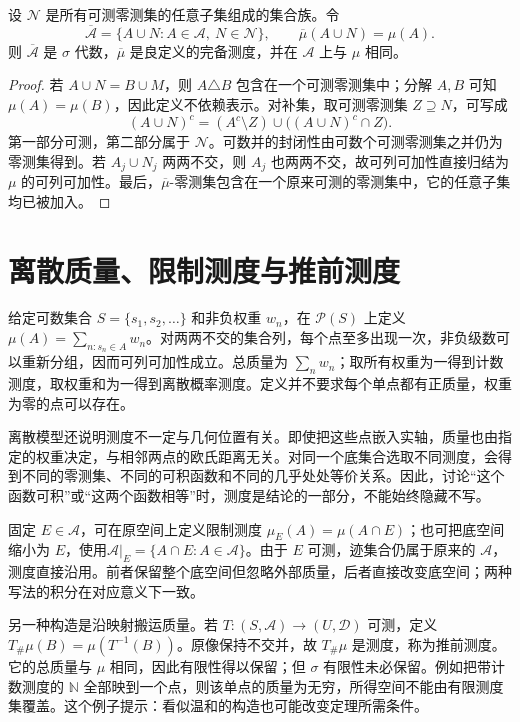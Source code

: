 \documentclass[UTF8,12pt,a4paper,fontset=fandol]{ctexbook}
\begin{document}
\begin{proposition}[完备化]
设 $\mathcal N$ 是所有可测零测集的任意子集组成的集合族。令
\[
 \overline{\mathcal A}=\{A\cup N:A\in\mathcal A,\ N\in\mathcal N\},\qquad
 \overline\mu(A\cup N)=\mu(A).
\]
则 $\overline{\mathcal A}$ 是 $\sigma$ 代数，$\overline\mu$ 是良定义的完备测度，并在 $\mathcal A$ 上与 $\mu$ 相同。
\label{prop:mt-completion}
\end{proposition}
\begin{proof}
若 $A\cup N=B\cup M$，则 $A\triangle B$ 包含在一个可测零测集中；分解 $A,B$ 可知 $\mu(A)=\mu(B)$，因此定义不依赖表示。对补集，取可测零测集 $Z\supseteq N$，可写成
\[
 (A\cup N)^c=(A^c\setminus Z)\cup\bigl((A\cup N)^c\cap Z\bigr).
\]
第一部分可测，第二部分属于 $\mathcal N$。可数并的封闭性由可数个可测零测集之并仍为零测集得到。若 $A_j\cup N_j$ 两两不交，则 $A_j$ 也两两不交，故可列可加性直接归结为 $\mu$ 的可列可加性。最后，$\overline\mu$-零测集包含在一个原来可测的零测集中，它的任意子集均已被加入。
\end{proof}

\section{离散质量、限制测度与推前测度}
给定可数集合 $S=\{s_1,s_2,\ldots\}$ 和非负权重 $w_n$，在 $\mathcal P(S)$ 上定义
$\mu(A)=\sum_{n:s_n\in A}w_n$。对两两不交的集合列，每个点至多出现一次，非负级数可以重新分组，因而可列可加性成立。总质量为 $\sum_nw_n$；取所有权重为一得到计数测度，取权重和为一得到离散概率测度。定义并不要求每个单点都有正质量，权重为零的点可以存在。

离散模型还说明测度不一定与几何位置有关。即使把这些点嵌入实轴，质量也由指定的权重决定，与相邻两点的欧氏距离无关。对同一个底集合选取不同测度，会得到不同的零测集、不同的可积函数和不同的几乎处处等价关系。因此，讨论“这个函数可积”或“这两个函数相等”时，测度是结论的一部分，不能始终隐藏不写。

固定 $E\in\mathcal A$，可在原空间上定义限制测度 $\mu_E(A)=\mu(A\cap E)$；也可把底空间缩小为 $E$，使用$\mathcal A|_E=\{A\cap E:A\in\mathcal A\}$。由于 $E$ 可测，迹集合仍属于原来的 $\mathcal A$，测度直接沿用。前者保留整个底空间但忽略外部质量，后者直接改变底空间；两种写法的积分在对应意义下一致。

另一种构造是沿映射搬运质量。若 $T:(S,\mathcal A)\to(U,\mathcal D)$ 可测，定义
$T_\#\mu(B)=\mu(T^{-1}(B))$。原像保持不交并，故 $T_\#\mu$ 是测度，称为推前测度。它的总质量与 $\mu$ 相同，因此有限性得以保留；但 $\sigma$ 有限性未必保留。例如把带计数测度的 $\mathbb N$ 全部映到一个点，则该单点的质量为无穷，所得空间不能由有限测度集覆盖。这个例子提示：看似温和的构造也可能改变定理所需条件。
\end{document}
